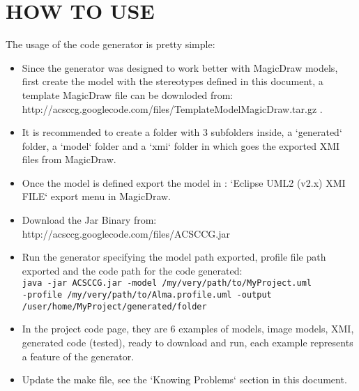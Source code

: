 \section{HOW TO USE}

The usage of the code generator is pretty simple:

\begin{itemize}
\item Since the generator was designed to work better with MagicDraw models,
first create the model with the stereotypes defined in this document, a template
MagicDraw file can be downloded from:\\
http://acsccg.googlecode.com/files/TemplateModelMagicDraw.tar.gz .
\item It is recommended to create a folder with 3 subfolders inside, a
`generated` folder, a `model` folder and a `xmi` folder in which goes the
exported XMI files from MagicDraw.
\item Once the model is defined export the model in : `Eclipse UML2 (v2.x) XMI
FILE` export menu in MagicDraw.
\item Download the Jar Binary from:\\
http://acsccg.googlecode.com/files/ACSCCG.jar
\item Run the generator specifying the model path exported, profile file path
exported and the code path for the code generated:\\ 
\verb+java -jar ACSCCG.jar -model /my/very/path/to/MyProject.uml+ \\
\verb+-profile /my/very/path/to/Alma.profile.uml -output+\\
\verb+/user/home/MyProject/generated/folder+\\
\item In the project code page, they are 6 examples of models, image models,
XMI, generated code (tested), ready to download and run, each example represents
a feature of the generator.
\item Update the make file, see the `Knowing Problems` section in this document.
\end{itemize}

